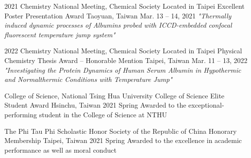 


\begin{cventries}


\cventry
{2021 Chemistry National Meeting, Chemical Society Located in Taipei}
{Excellent Poster Presentation Award}
{Taoyuan, Taiwan}
{Mar. 13 -- 14, 2021}
{\textit{"Thermally induced dynamic processes of Albumins probed with ICCD-embedded confocal fluorescent temperature jump system"}}


\cventry
{2022 Chemistry National Meeting, Chemical Society Located in Taipei}
{Physical Chemistry Thesis Award -- Honorable Mention}
{Taipei, Taiwan}
{Mar. 11 -- 13, 2022}
{\textit{"Investigating the Protein Dynamics of Human Serum Albumin in Hypothermic and Normalthermic Conditions with Temperature Jump"}}


\cventry
{College of Science, National Tsing Hua University}
{College of Science Elite Student Award}
{Hsinchu, Taiwan}
{2021 Spring}
{Awarded to the exceptional-performing student in the College of Science at NTHU}


\cventry
{The Phi Tau Phi Scholastic Honor Society of the Republic of China}
{Honorary Membership}
{Taipei, Taiwan}
{2021 Spring}
{Awarded to the excellence in academic performance as well as moral conduct}


\end{cventries}
